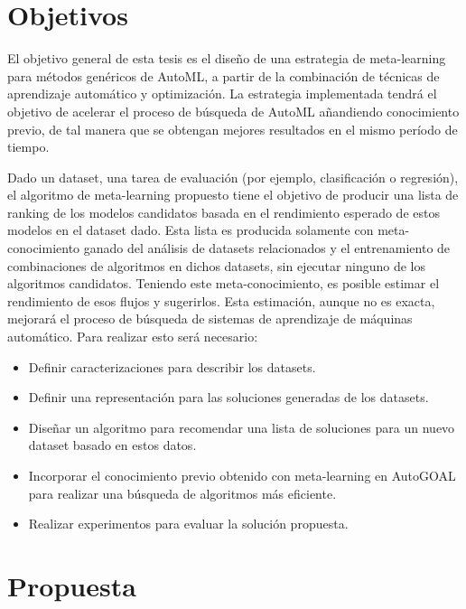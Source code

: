 \section*{Objetivos}

El objetivo general de esta tesis es el diseño de una estrategia de meta-learning para métodos genéricos de AutoML, a partir de la combinación de técnicas de aprendizaje automático y optimización. La estrategia implementada tendrá el objetivo de acelerar el proceso de búsqueda de AutoML añandiendo conocimiento previo, de tal manera que se obtengan mejores resultados en el mismo período de tiempo. 


 Dado un dataset, una tarea de evaluación (por ejemplo, clasificación o regresión), el algoritmo de meta-learning propuesto tiene el objetivo de producir una lista de ranking de los modelos candidatos basada en el rendimiento esperado de estos modelos en el dataset dado. Esta lista es producida solamente con meta-conocimiento ganado del análisis de datasets relacionados y el entrenamiento de combinaciones de algoritmos en dichos datasets, sin ejecutar ninguno de los algoritmos candidatos. Teniendo este meta-conocimiento, es posible estimar el rendimiento de esos flujos y sugerirlos. Esta estimación, aunque no es exacta, mejorará el proceso de búsqueda de sistemas de aprendizaje de máquinas automático. Para realizar esto será necesario:
 

\begin{itemize}
	\item Definir caracterizaciones para describir los datasets.
	\item Definir una representación para las soluciones generadas de los datasets.
	\item Diseñar un algoritmo para recomendar una lista de soluciones para un nuevo dataset basado en estos datos.
	\item Incorporar el conocimiento previo obtenido con meta-learning en AutoGOAL para realizar una búsqueda de algoritmos más eficiente.
	\item Realizar experimentos para evaluar la solución propuesta.
\end{itemize}

\section*{Propuesta}

